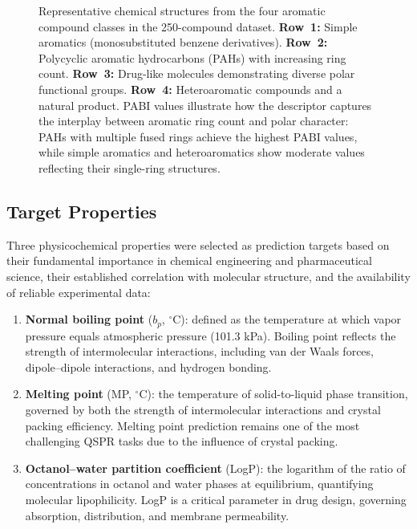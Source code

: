 \documentclass[12pt,a4paper]{article}
\begin{document}
\begin{figure}[H]
\begin{tabular}{@{}c@{\hskip 1.5em}c@{\hskip 1.5em}c@{\hskip 1.5em}c@{}}
\end{tabular}

\caption{Representative chemical structures from the four aromatic compound classes in the 250-compound dataset. \textbf{Row~1:} Simple aromatics (monosubstituted benzene derivatives). \textbf{Row~2:} Polycyclic aromatic hydrocarbons (PAHs) with increasing ring count. \textbf{Row~3:} Drug-like molecules demonstrating diverse polar functional groups. \textbf{Row~4:} Heteroaromatic compounds and a natural product. PABI values illustrate how the descriptor captures the interplay between aromatic ring count and polar character: PAHs with multiple fused rings achieve the highest PABI values, while simple aromatics and heteroaromatics show moderate values reflecting their single-ring structures.}
\label{fig:structures}
\end{figure}

\subsection{Target Properties}

Three physicochemical properties were selected as prediction targets based on their fundamental importance in chemical engineering and pharmaceutical science, their established correlation with molecular structure, and the availability of reliable experimental data:

\begin{enumerate}[leftmargin=2em]
\item \textbf{Normal boiling point} ($b_p$, $^{\circ}$C): defined as the temperature at which vapor pressure equals atmospheric pressure (101.3 kPa). Boiling point reflects the strength of intermolecular interactions, including van der Waals forces, dipole--dipole interactions, and hydrogen bonding\cite{katritzky2001interpretation}.
\item \textbf{Melting point} (MP, $^{\circ}$C): the temperature of solid-to-liquid phase transition, governed by both the strength of intermolecular interactions and crystal packing efficiency. Melting point prediction remains one of the most challenging QSPR tasks due to the influence of crystal packing\cite{tropsha2010best}.
\item \textbf{Octanol--water partition coefficient} (LogP): the logarithm of the ratio of concentrations in octanol and water phases at equilibrium, quantifying molecular lipophilicity. LogP is a critical parameter in drug design, governing absorption, distribution, and membrane permeability\cite{lipinski2012rule}.
\end{enumerate}
\end{document}
